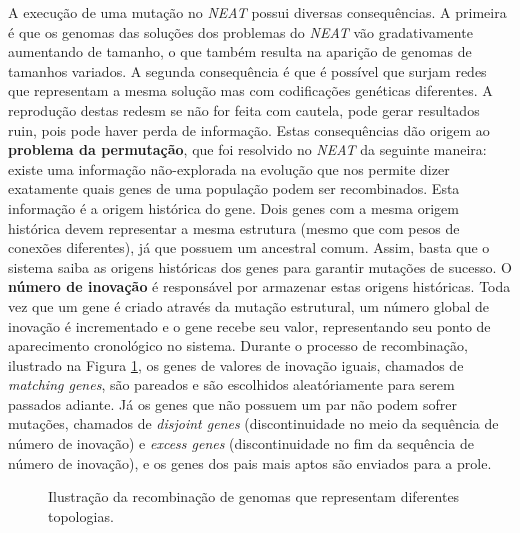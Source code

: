 A execução de uma mutação no \textit{NEAT} possui diversas consequências. A
primeira é que os genomas das soluções dos problemas do \textit{NEAT} vão
gradativamente aumentando de tamanho, o que também resulta na aparição de
genomas de tamanhos variados. A segunda consequência é que é possível que surjam
redes que representam a mesma solução mas com codificações genéticas diferentes.
A reprodução destas redesm se não for feita com cautela, pode gerar resultados
ruin, pois pode haver perda de informação. Estas consequências dão origem ao
\textbf{problema da permutação}, que foi resolvido no \textit{NEAT} da seguinte
maneira: existe uma informação não-explorada na evolução que nos permite dizer
exatamente quais genes de uma população podem ser recombinados. Esta informação
é a origem histórica do gene. Dois genes com a mesma origem histórica devem
representar a mesma estrutura (mesmo que com pesos de conexões diferentes), já
que possuem um ancestral comum. Assim, basta que o sistema saiba as origens
históricas dos genes para garantir mutações de sucesso.  O \textbf{número de
inovação} é responsável por armazenar estas origens históricas.  Toda vez que um
gene é criado através da mutação estrutural, um número global de inovação é
incrementado e o gene recebe seu valor, representando seu ponto de aparecimento
cronológico no sistema.  Durante o processo de recombinação, ilustrado na Figura
\ref{fig:neat-innovation-matchup}, os genes de valores de inovação iguais,
chamados de \textit{matching genes}, são pareados e são escolhidos
aleatóriamente para serem passados adiante. Já os genes que não possuem um par
não podem sofrer mutações, chamados de \textit{disjoint genes} (discontinuidade
no meio da sequência de número de inovação) e \textit{excess genes}
(discontinuidade no fim da sequência de número de inovação), e os genes dos pais
mais aptos são enviados para a prole.

\begin{figure}[H]
\centering
\caption {\label{fig:neat-innovation-matchup}Ilustração da recombinação de
genomas que representam diferentes topologias.}
\end{figure}


